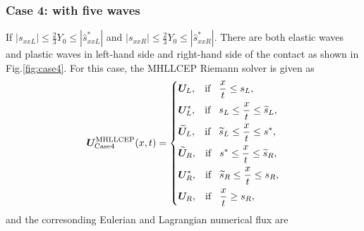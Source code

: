 \documentclass{article}
\numberwithin{equation}{section}
\numberwithin{table}{section}
\begin{document}
\subsubsection{Case 4: with five waves}
If $|s_{xxL}| \le \frac{2}{3}Y_0 \le  |\hat{s}_{xxL}^*|$ and  $|s_{xxR}| \le \frac{2}{3}Y_0 \le  |\hat{s}_{xxR}^*|$. There are  both elastic waves and plastic waves in left-hand side and right-hand side of the contact as shown in Fig.\ref{fig:case4}. For this case, the MHLLCEP Riemann solver is given as
 \begin{equation}
   \bm{U}^{\text{MHLLCEP}}_{\text{Case4}}(x,t) = \left\{ \begin{aligned}
		& \bm{U}_L, \hspace{0.3cm} \text{if} \hspace{0.3cm} \frac{x}{t}\le s_L, \\
		& \bm{U}_L^*, \hspace{0.3cm} \text{if} \hspace{0.3cm} s_L\le \frac{x}{t} \le \widetilde{s}_L, \\
		& \widetilde{\bm{U}}_L, \hspace{0.3cm} \text{if} \hspace{0.3cm} \widetilde{s}_L\le \frac{x}{t} \le s^*, \\
		& \widetilde{\bm{U}}_R, \hspace{0.3cm} \text{if} \hspace{0.3cm} s^*\le \frac{x}{t} \le \widetilde{s}_R, \\
		& \bm{U}_R^*, \hspace{0.3cm} \text{if} \hspace{0.3cm} \widetilde{s}_R\le \frac{x}{t} \le s_R,\\
		& \bm{U}_R, \hspace{0.3cm} \text{if} \hspace{0.3cm} \frac{x}{t}\ge s_R, \\
	  \end{aligned}
	\right.
  \end{equation}
  and the corresonding Eulerian and Lagrangian numerical flux are
\end{document}
